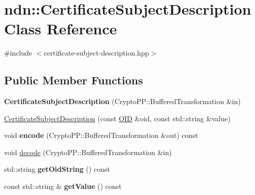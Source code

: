 \hypertarget{classndn_1_1CertificateSubjectDescription}{}\section{ndn\+:\+:Certificate\+Subject\+Description Class Reference}
\label{classndn_1_1CertificateSubjectDescription}


{\ttfamily \#include $<$certificate-\/subject-\/description.\+hpp$>$}

\subsection*{Public Member Functions}
\begin{DoxyCompactItemize}
\item 
{\bfseries Certificate\+Subject\+Description} (Crypto\+P\+P\+::\+Buffered\+Transformation \&in)\hypertarget{classndn_1_1CertificateSubjectDescription_a4abe3bb379cc5b85c2c933edc853b0e7}{}\label{classndn_1_1CertificateSubjectDescription_a4abe3bb379cc5b85c2c933edc853b0e7}

\item 
\hyperlink{classndn_1_1CertificateSubjectDescription_ad2a80406490e61d509a2c3ddb7e1cb11}{Certificate\+Subject\+Description} (const \hyperlink{classndn_1_1OID}{O\+ID} \&oid, const std\+::string \&value)
\item 
void {\bfseries encode} (Crypto\+P\+P\+::\+Buffered\+Transformation \&out) const\hypertarget{classndn_1_1CertificateSubjectDescription_a11a446ca178821db44b1699a7cf44d9e}{}\label{classndn_1_1CertificateSubjectDescription_a11a446ca178821db44b1699a7cf44d9e}

\item 
void \hyperlink{classndn_1_1CertificateSubjectDescription_a9a4b924eac644c0ca0cf209f06d81931}{decode} (Crypto\+P\+P\+::\+Buffered\+Transformation \&in)
\item 
std\+::string {\bfseries get\+Oid\+String} () const\hypertarget{classndn_1_1CertificateSubjectDescription_ab4abd8f3f66eb19178f6de1138113a75}{}\label{classndn_1_1CertificateSubjectDescription_ab4abd8f3f66eb19178f6de1138113a75}

\item 
const std\+::string \& {\bfseries get\+Value} () const\hypertarget{classndn_1_1CertificateSubjectDescription_ac6b9aec3db859527e6142ba02b81a7e0}{}\label{classndn_1_1CertificateSubjectDescription_ac6b9aec3db859527e6142ba02b81a7e0}

\end{DoxyCompactItemize}


